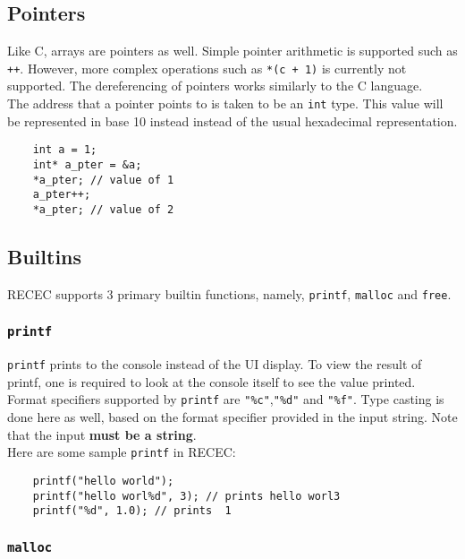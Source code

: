 \documentclass[a4paper]{article}
\begin{document}
\subsection{Pointers}

Like C, arrays are pointers as well. Simple pointer arithmetic is supported such as \texttt{++}. However, more complex operations such as \texttt{*(c + 1)} is currently not supported. The dereferencing of pointers works similarly to the C language. \\

The address that a pointer points to is taken to be an \texttt{int} type. This value will be represented in base 10 instead instead of the usual hexadecimal representation. 

\begin{verbatim}
	int a = 1;
	int* a_pter = &a;
	*a_pter; // value of 1
	a_pter++;
	*a_pter; // value of 2
\end{verbatim}

\subsection{Builtins}

RECEC supports 3 primary builtin functions, namely, \texttt{printf}, \texttt{malloc} and \texttt{free}.\\

\subsubsection{\texttt{printf}}

\texttt{printf} prints to the console instead of the UI display. To view the result of printf, one is required to look at the console itself to see the value printed. Format specifiers supported by \texttt{printf} are \texttt{"\%c"},\texttt{"\%d"} and \texttt{"\%f"}. Type casting is done here as well, based on the format specifier provided in the input string. Note that the input \textbf{must be a string}. \\

Here are some sample \texttt{printf} in RECEC:
\begin{verbatim}
	printf("hello world");
	printf("hello worl%d", 3); // prints hello worl3
	printf("%d", 1.0); // prints  1
\end{verbatim}

\subsubsection{\texttt{malloc}}
\end{document}
